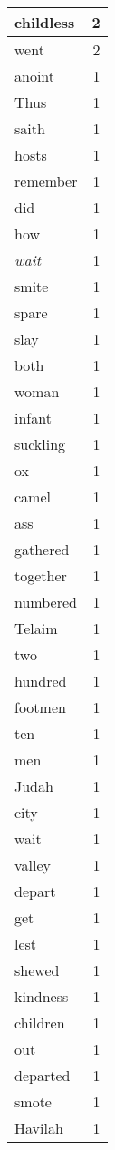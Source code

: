 \begin{center}
\begin{longtable}{l|r}
childless & 2 \\ \hline
went & 2 \\ \hline
anoint & 1 \\ \hline
Thus & 1 \\ \hline
saith & 1 \\ \hline
hosts & 1 \\ \hline
remember & 1 \\ \hline
did & 1 \\ \hline
how & 1 \\ \hline
\emph{wait} & 1 \\ \hline
smite & 1 \\ \hline
spare & 1 \\ \hline
slay & 1 \\ \hline
both & 1 \\ \hline
woman & 1 \\ \hline
infant & 1 \\ \hline
suckling & 1 \\ \hline
ox & 1 \\ \hline
camel & 1 \\ \hline
ass & 1 \\ \hline
gathered & 1 \\ \hline
together & 1 \\ \hline
numbered & 1 \\ \hline
Telaim & 1 \\ \hline
two & 1 \\ \hline
hundred & 1 \\ \hline
footmen & 1 \\ \hline
ten & 1 \\ \hline
men & 1 \\ \hline
Judah & 1 \\ \hline
city & 1 \\ \hline
wait & 1 \\ \hline
valley & 1 \\ \hline
depart & 1 \\ \hline
get & 1 \\ \hline
lest & 1 \\ \hline
shewed & 1 \\ \hline
kindness & 1 \\ \hline
children & 1 \\ \hline
out & 1 \\ \hline
departed & 1 \\ \hline
smote & 1 \\ \hline
Havilah & 1 \\ \hline

\end{longtable}
\end{center}
